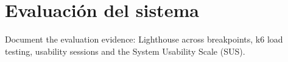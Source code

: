 
\section{Evaluación del sistema}

Document the evaluation evidence: Lighthouse across breakpoints, k6 load
testing, usability sessions and the System Usability Scale (SUS).
